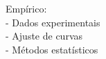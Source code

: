 \documentclass[preview]{standalone}
\begin{document}
Empírico:\\- Dados experimentais\\- Ajuste de curvas\\- Métodos estatísticos\\
\end{document}
